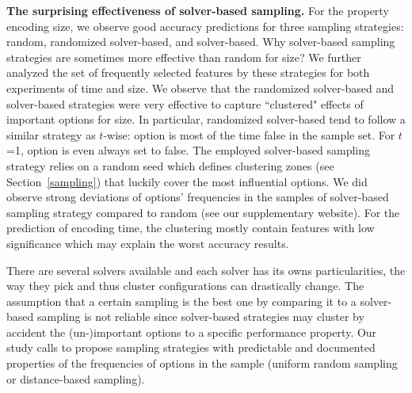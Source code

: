 \textbf{The surprising effectiveness of solver-based sampling.}
For the property encoding size, we observe good accuracy predictions for three sampling strategies: random, randomized solver-based, and solver-based.
 Why solver-based sampling strategies are sometimes more effective than random for size?
We further analyzed the set of frequently selected features by these strategies for both experiments of time and size.
We observe that the randomized solver-based and solver-based strategies were very effective to capture ``clustered" effects of important options for size. 
In particular, randomized solver-based tend to follow a similar strategy as $t$-wise:  option is most of the time false in the sample set. 
For $t$=1,  option is even always set to false. 
 The employed solver-based sampling strategy relies on a random seed which defines clustering zones (see Section~\ref{sampling}) that luckily cover the most influential options. We did observe strong deviations of options' frequencies in the samples of solver-based sampling strategy compared to random (see our supplementary website). For the prediction of encoding time, the clustering mostly contain features with low significance which may explain the worst accuracy results. 

There are several solvers available and each solver has its owns particularities, \ie the way they pick and thus cluster configurations can drastically change. 
The assumption that a certain sampling is the best one by comparing it to a solver-based sampling is not reliable since solver-based strategies may cluster by accident the (un-)important options to a specific performance property.
Our study calls to propose sampling strategies with predictable and documented properties of the frequencies of options in the sample (\eg uniform random sampling or distance-based sampling).

